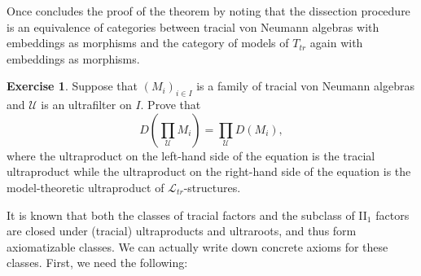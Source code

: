 \documentclass[12pt]{amsart}
\theoremstyle{definition}
\newtheorem{ex}[thm]{Exercise}
\def\cal{\mathcal}
\def\u{\mathsf 1}
\newcommand\cL{{\cal L}}
\newcommand\bN{{\mathbb N}}
\def \u{\mathcal U}
\begin{document}


Once concludes the proof of the theorem by noting that the dissection procedure is an equivalence of categories between tracial von Neumann algebras with embeddings as morphisms and the category of models of $T_{tr}$ again with embeddings as morphisms.

\begin{ex}
Suppose that $(M_i)_{i\in I}$ is a family of tracial von Neumann algebras and $\u$ is an ultrafilter on $I$.  Prove that
$$D\left(\prod_\u M_i\right)=\prod_\u D(M_i),$$ where the ultraproduct on the left-hand side of the equation is the tracial ultraproduct while the ultraproduct on the right-hand side of the equation is the model-theoretic ultraproduct of $\cL_{tr}$-structures.
\end{ex} 

It is known that both the classes of tracial factors and the subclass of II$_1$ factors are closed under (tracial) ultraproducts and ultraroots, and thus form axiomatizable classes.  We can actually write down concrete axioms for these classes.  First, we need the following:
\end{document}
